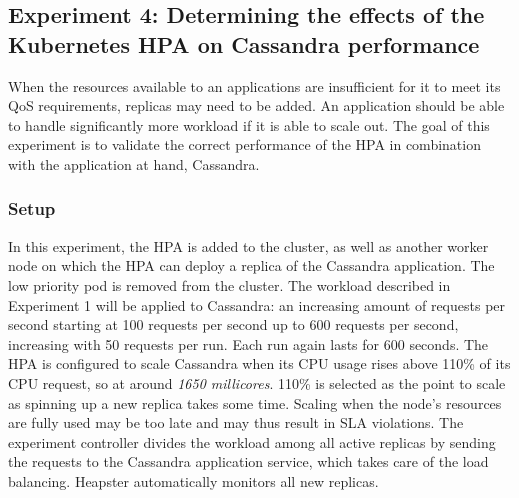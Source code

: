 \subsection{Experiment 4: Determining the effects of the Kubernetes HPA on Cassandra performance}
\label{exp:hpa-cass}
When the resources available to an applications are insufficient for it to meet its QoS requirements, replicas may need to be added. An application should be able to handle significantly more workload if it is able to scale out. The goal of this experiment is to validate the correct performance of the HPA in combination with the application at hand, Cassandra. 

\subsubsection{Setup}
In this experiment, the HPA is added to the cluster, as well as another worker node on which the HPA can deploy a replica of the Cassandra application. The low priority pod is removed from the cluster. The workload described in Experiment 1 will be applied to Cassandra: an increasing amount of requests per second starting at 100 requests per second up to 600 requests per second, increasing with 50 requests per run. Each run again lasts for 600 seconds. The HPA is configured to scale Cassandra when its CPU usage rises above 110\% of its CPU request, so at around \textit{1650 millicores}. 110\% is selected as the point to scale as spinning up a new replica takes some time. Scaling when the node's resources are fully used may be too late and may thus result in SLA violations. The experiment controller divides the workload among all active replicas by sending the requests to the Cassandra application service, which takes care of the load balancing. Heapster automatically monitors all new replicas. 

